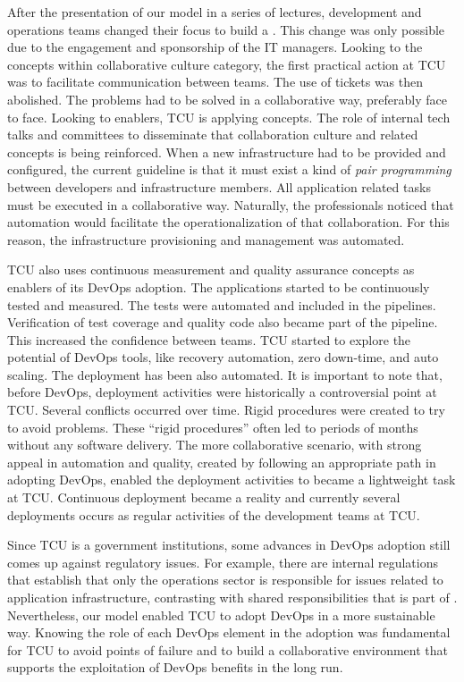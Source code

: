 After the presentation of our  model in a series of lectures, development and
operations teams changed their focus to build a \cc. This
change was only possible due to the engagement and sponsorship of the IT
managers. Looking to the concepts within collaborative culture category, the first practical
action at TCU was to facilitate communication between teams. The use of tickets
was then abolished. The problems had to be solved in a collaborative way, preferably
face to face.
Looking to enablers, TCU is applying  concepts.
The role of internal tech talks and committees to disseminate that collaboration
culture and related concepts is being reinforced.
When a new infrastructure had to be provided and configured, the current guideline is
that it must exist a kind of \emph{pair programming} between developers and infrastructure
members. All application related tasks must be executed in a collaborative
way. Naturally, the professionals noticed that automation would facilitate the
operationalization of that collaboration. For this reason, the infrastructure provisioning
and management was automated.


TCU also uses continuous measurement and quality assurance concepts as
enablers of its DevOps adoption. The applications started to be continuously
tested and measured. The tests were automated and included in the pipelines.
Verification of test coverage and quality code also became part of the pipeline.
This increased the confidence between teams. TCU started
to explore the potential of DevOps tools, like recovery automation, zero
down-time, and auto scaling. The deployment has been also automated.
It is important to note that, before DevOps, deployment activities were historically a controversial point at TCU.
Several conflicts occurred over time. Rigid procedures were created to try to
avoid problems. These ``rigid procedures'' often led to periods of months
without any software delivery. The more collaborative scenario, with strong appeal in automation and quality,
created by following an appropriate path in adopting DevOps, enabled the deployment activities to became
a lightweight task at TCU. Continuous deployment became a reality and currently several deployments
occurs as regular activities of the development teams at TCU.

Since TCU is a government institutions, some advances in DevOps adoption still comes up
against regulatory issues. For example, there are internal regulations that
establish that only the operations sector is responsible for issues related to
application infrastructure, contrasting with shared responsibilities that is
part of \cc. Nevertheless, our model enabled TCU to adopt DevOps in a more
sustainable way. Knowing the role
of each DevOps element in the adoption was fundamental for TCU to avoid points
of failure and to build a collaborative environment that supports the
exploitation of DevOps benefits in the long run.
